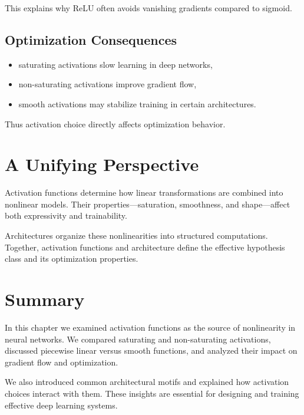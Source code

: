 This explains why ReLU often avoids vanishing gradients compared to sigmoid.

\subsection{Optimization Consequences}

\begin{itemize}
    \item saturating activations slow learning in deep networks,
    \item non-saturating activations improve gradient flow,
    \item smooth activations may stabilize training in certain architectures.
\end{itemize}

Thus activation choice directly affects optimization behavior.

\section{A Unifying Perspective}

Activation functions determine how linear transformations are combined into nonlinear models. Their properties—saturation, smoothness, and shape—affect both expressivity and trainability.

Architectures organize these nonlinearities into structured computations. Together, activation functions and architecture define the effective hypothesis class and its optimization properties.

\section{Summary}

In this chapter we examined activation functions as the source of nonlinearity in neural networks. We compared saturating and non-saturating activations, discussed piecewise linear versus smooth functions, and analyzed their impact on gradient flow and optimization.

We also introduced common architectural motifs and explained how activation choices interact with them. These insights are essential for designing and training effective deep learning systems.